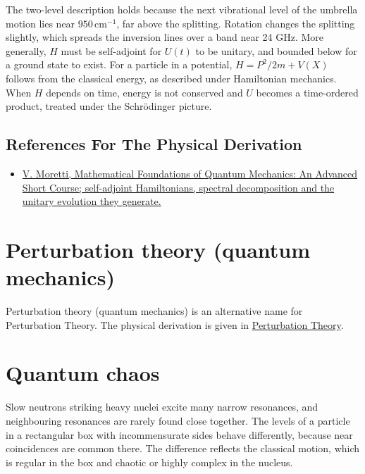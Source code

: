 \documentclass[11pt,oneside]{book}
\begin{document}
The two-level description holds because the next vibrational level of the umbrella motion lies near \(950\,\mathrm{cm}^{-1}\), far above the splitting. Rotation changes the splitting slightly, which spreads the inversion lines over a band near 24 GHz. More generally, \(H\) must be self-adjoint for \(U(t)\) to be unitary, and bounded below for a ground state to exist. For a particle in a potential, \(H=P^2/2m+V(X)\) follows from the classical energy, as described under Hamiltonian mechanics. When \(H\) depends on time, energy is not conserved and \(U\) becomes a time-ordered product, treated under the Schrödinger picture.

\subsection*{References For The Physical Derivation}
\begin{itemize}
\item \href{https://arxiv.org/abs/1508.06951}{V. Moretti, Mathematical Foundations of Quantum Mechanics: An Advanced Short Course; self-adjoint Hamiltonians, spectral decomposition and the unitary evolution they generate.}
\end{itemize}





\clearpage
\section{Perturbation theory (quantum mechanics)}
\label{topic:perturbation-theory-quantum-mechanics}
Perturbation theory (quantum mechanics) is an alternative name for Perturbation Theory.
The physical derivation is given in \hyperref[topic:perturbation-theory]{Perturbation Theory}.

\clearpage

\section{Quantum chaos}

\label{topic:quantum-chaos}

Slow neutrons striking heavy nuclei excite many narrow resonances, and neighbouring resonances are rarely found close together. The levels of a particle in a rectangular box with incommensurate sides behave differently, because near coincidences are common there. The difference reflects the classical motion, which is regular in the box and chaotic or highly complex in the nucleus.
\end{document}
